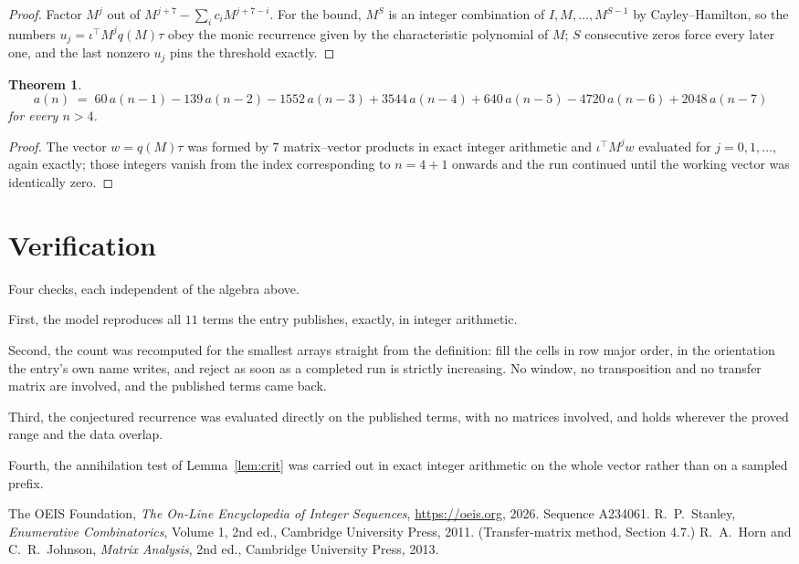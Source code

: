 \documentclass[11pt,a4paper]{article}
\theoremstyle{plain}
\newtheorem{theorem}{Theorem}
\theoremstyle{definition}
\begin{document}
\begin{proof}
Factor $M^{j}$ out of $M^{j+7}-\sum_ic_iM^{j+7-i}$. For the bound, $M^{S}$
is an integer combination of $I,M,\dots,M^{S-1}$ by Cayley--Hamilton, so the numbers
$u_j=\iota^{\!\top}M^{j}q(M)\tau$ obey the monic recurrence given by the characteristic
polynomial of $M$; $S$ consecutive zeros force every later one, and the last nonzero $u_j$
pins the threshold exactly.
\end{proof}

\begin{theorem}
\[
a(n)\;=\;60\,a(n-1) - 139\,a(n-2) - 1552\,a(n-3) + 3544\,a(n-4) + 640\,a(n-5) - 4720\,a(n-6) + 2048\,a(n-7)
\]
for every $n>4$.
\end{theorem}

\begin{proof}
The vector $w=q(M)\tau$ was formed by $7$ matrix--vector products in exact integer
arithmetic and $\iota^{\!\top}M^{j}w$ evaluated for $j=0,1,\dots$, again exactly; those
integers vanish from the index corresponding to $n=4+1$ onwards and the run continued
until the working vector was identically zero.
\end{proof}

\section{Verification}

Four checks, each independent of the algebra above.

First, the model reproduces all $11$ terms the entry publishes, exactly, in integer
arithmetic.

Second, the count was recomputed for the smallest arrays straight from the definition: fill the
cells in row major order, in the orientation the entry's own name writes, and reject as soon as
a completed run is strictly increasing. No window, no transposition and no transfer matrix are involved, and
the published terms came back.

Third, the conjectured recurrence was evaluated directly on the published terms, with no
matrices involved, and holds wherever the proved range and the data overlap.

Fourth, the annihilation test of Lemma~\ref{lem:crit} was carried out in exact integer
arithmetic on the whole vector rather than on a sampled prefix.

\begin{thebibliography}{9}
 The OEIS Foundation, \emph{The On-Line Encyclopedia of Integer
Sequences}, \url{https://oeis.org}, 2026. Sequence A234061.
 R.~P.~Stanley, \emph{Enumerative Combinatorics}, Volume 1, 2nd ed.,
Cambridge University Press, 2011. (Transfer-matrix method, Section 4.7.)
 R.~A.~Horn and C.~R.~Johnson, \emph{Matrix Analysis}, 2nd ed., Cambridge
University Press, 2013.
\end{thebibliography}
\end{document}
